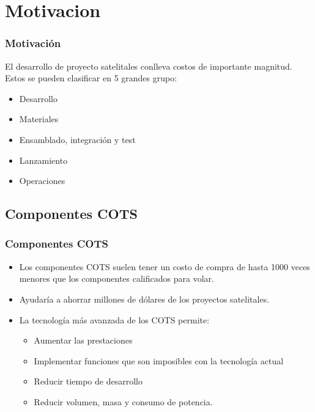 \section{Motivacion}
\begin{frame}
 \frametitle{Motivación}
	El desarrollo de proyecto satelitales conlleva costos de importante magnitud. Estos se pueden clasificar en 5 grandes grupo:
	\begin{itemize}
		\item Desarrollo
		\item Materiales
		\item Ensamblado, integración y test
		\item Lanzamiento
		\item Operaciones
	\end{itemize}
\end{frame}

\subsection{Componentes COTS}
\begin{frame}
	\frametitle{Componentes COTS}
	\begin{itemize}
		\item Los componentes COTS suelen tener un costo de compra  de hasta 1000 veces menores que los componentes calificados para volar.
		\item Ayudaría a ahorrar millones de dólares de los proyectos satelitales. 
		\item La tecnología más avanzada de los COTS permite:
		\begin{itemize}
			\item Aumentar las prestaciones
			\item Implementar funciones que son imposibles con la tecnología actual
			\item Reducir tiempo de desarrollo
			\item Reducir volumen, masa y consumo de potencia.
		\end{itemize}
	\end{itemize}



	

	
	
\end{frame}